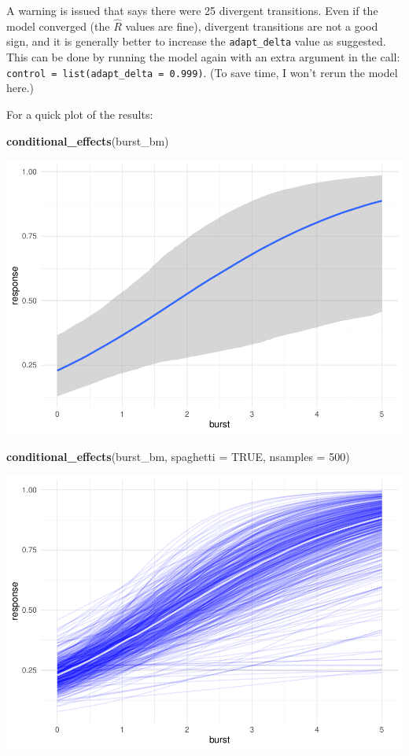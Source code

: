 \documentclass[
]{article}
\newenvironment{Shaded}{\begin{snugshade}}{\end{snugshade}}
\newcommand{\DataTypeTok}[1]{\textcolor[rgb]{0.13,0.29,0.53}{#1}}
\newcommand{\DecValTok}[1]{\textcolor[rgb]{0.00,0.00,0.81}{#1}}
\newcommand{\KeywordTok}[1]{\textcolor[rgb]{0.13,0.29,0.53}{\textbf{#1}}}
\newcommand{\NormalTok}[1]{#1}
\newcommand{\OtherTok}[1]{\textcolor[rgb]{0.56,0.35,0.01}{#1}}
\begin{document}
A warning is issued that says there were 25 divergent transitions. Even
if the model converged (the \(\hat{R}\) values are fine), divergent
transitions are not a good sign, and it is generally better to increase
the \texttt{adapt\_delta} value as suggested. This can be done by
running the model again with an extra argument in the call:
\texttt{control\ =\ list(adapt\_delta\ =\ 0.999)}. (To save time, I
won't rerun the model here.)

For a quick plot of the results:

\begin{Shaded}
\begin{Highlighting}[]
\KeywordTok{conditional\_effects}\NormalTok{(burst\_bm)}
\end{Highlighting}
\end{Shaded}

\includegraphics{bayes-reg-3_files/figure-latex/burst-cond-1.pdf}

\begin{Shaded}
\begin{Highlighting}[]
\KeywordTok{conditional\_effects}\NormalTok{(burst\_bm, }\DataTypeTok{spaghetti =} \OtherTok{TRUE}\NormalTok{, }\DataTypeTok{nsamples =} \DecValTok{500}\NormalTok{)}
\end{Highlighting}
\end{Shaded}

\includegraphics{bayes-reg-3_files/figure-latex/burst-cond-2.pdf}
\end{document}
